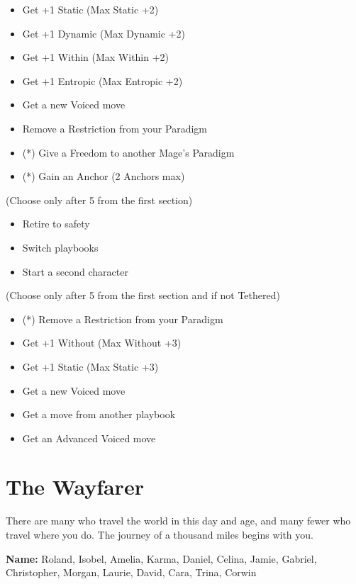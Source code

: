 \documentclass[
  oneside,
  statementpaper,
  9pt]{memoir}
\begin{document}
\begin{itemize}
\tightlist
\item
  Get +1 Static (Max Static +2)
\item
  Get +1 Dynamic (Max Dynamic +2)
\item
  Get +1 Within (Max Within +2)
\item
  Get +1 Entropic (Max Entropic +2)
\item
  Get a new Voiced move
\item
  Remove a Restriction from your Paradigm
\item
  (*) Give a Freedom to another Mage's Paradigm
\item
  (*) Gain an Anchor (2 Anchors max)
\end{itemize}

(Choose only after 5 from the first section)

\begin{itemize}
\tightlist
\item
  Retire to safety
\item
  Switch playbooks
\item
  Start a second character
\end{itemize}

(Choose only after 5 from the first section and if not Tethered)

\begin{itemize}
\tightlist
\item
  (*) Remove a Restriction from your Paradigm
\item
  Get +1 Without (Max Without +3)
\item
  Get +1 Static (Max Static +3)
\item
  Get a new Voiced move
\item
  Get a move from another playbook
\item
  Get an Advanced Voiced move
\end{itemize}

\newpage

\hypertarget{the-wayfarer}{%
\section{The Wayfarer}\label{the-wayfarer}}

There are many who travel the world in this day and age, and many fewer
who travel where you do. The journey of a thousand miles begins with
you.

\textbf{Name:} Roland, Isobel, Amelia, Karma, Daniel, Celina, Jamie,
Gabriel, Christopher, Morgan, Laurie, David, Cara, Trina, Corwin
\end{document}
